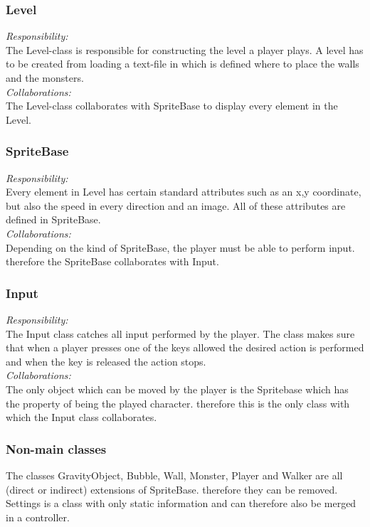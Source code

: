 \subsubsection{Level}
\textit{Responsibility:} \\
The Level-class is responsible for constructing the level a player plays. A level has to be created from loading a text-file in which is defined where to place the walls and the monsters. \\
\textit{Collaborations:} \\
The Level-class collaborates with SpriteBase to display every element in the Level.  

\subsubsection{SpriteBase}
\textit{Responsibility:} \\
Every element in Level has certain standard attributes such as an x,y coordinate, but also the speed in every direction and an image. All of these attributes are defined in SpriteBase. \\
\textit{Collaborations:} \\
Depending on the kind of SpriteBase, the player must be able to perform input. therefore the SpriteBase collaborates with Input. 

\subsubsection{Input}
\textit{Responsibility:} \\
The Input class catches all input performed by the player. The class makes sure that when a player presses one of the keys allowed the desired action is performed and when the key is released the action stops. \\
\textit{Collaborations:} \\
The only object which can be moved by the player is the Spritebase which has the property of being the played character. therefore this is the only class with which the Input class collaborates. 

\subsubsection{Non-main classes}
The classes GravityObject, Bubble, Wall, Monster, Player and Walker are all (direct or indirect) extensions of SpriteBase. therefore they can be removed. Settings is a class with only static information and can therefore also be merged in a controller. 